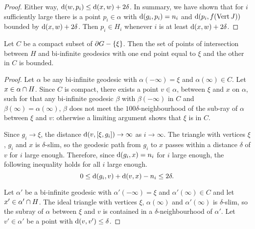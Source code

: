 \documentclass[a4paper]{article}
\begin{document}
\begin{proof}
  Either way, $\operatorname{d}(w, p_i) \leq \operatorname{d}(x,w) + 2\delta$. In summary, we have
  shown that for $i$ sufficiently large there is a point $p_i\in\alpha$ with
  $\operatorname{d}(g_i,p_i)=n_i$ and $\operatorname{d}(p_i,f(\operatorname{Vert} J))$ bounded by $\operatorname{d}(x,w) +
  2\delta$. Then $p_i \in H_i$ whenever $i$ is at least $\operatorname{d}(x,w) + 2\delta$.
\end{proof}

\begin{lemma}\label{lem:boundedintersection}
  Let $C$ be a compact subset of $\partial G - \left\{\xi\right\}$. Then the set of points 
  of intersection between $H$ and bi-infinite geodesics with one end point equal 
  to $\xi$ and the other in $C$ is bounded.
\end{lemma}

\begin{proof}
  Let $\alpha$ be any bi-infinite geodesic with $\alpha(-\infty)=\xi$ and 
  $\alpha(\infty)\in C$. Let $x \in \alpha \cap H$. Since $C$ is
  compact, there exists a point $v \in \alpha$, between $\xi$ and $x$ on
  $\alpha$, such for that any bi-infinite geodesic $\beta$ with
  $\beta(-\infty)$ in $C$ and $\beta(\infty) = \alpha(\infty)$, $\beta$ does
  not meet the $100\delta$-neighbourhood of the sub-ray of $\alpha$ between
  $\xi$ and $v$: otherwise a limiting argument shows that $\xi$ is in $C$.

  Since $g_i \to \xi$, the distance $\operatorname{d}(v, [\xi, g_i]) \to \infty$ as
  $i\to\infty$. The triangle with vertices $\xi$, $g_i$ and $x$ is
  $\delta$-slim, so the geodesic path from $g_i$ to $x$ passes within a
  distance $\delta$ of $v$ for $i$ large enough. Therefore, since $\operatorname{d}(g_i,
  x) = n_i$ for $i$ large enough, the following inequality holds for all $i$
  large enough.
  \begin{equation*}
    0 \leq \operatorname{d}(g_i, v) + \operatorname{d}(v, x) - n_i \leq 2\delta.
  \end{equation*}

  Let $\alpha'$ be a bi-infinite geodesic with $\alpha'(-\infty) = \xi$ and
  $\alpha'(\infty) \in C$ and let $x' \in \alpha' \cap H$. The ideal
  triangle with vertices $\xi$, $\alpha(\infty)$ and $\alpha'(\infty)$ is
  $\delta$-slim, so the subray of $\alpha$ between $\xi$ and $v$ is contained
  in a $\delta$-neighbourhood of $\alpha'$.  Let $v' \in \alpha'$ be a point
  with $\operatorname{d}(v, v') \leq \delta$. 
  

\end{proof}
\end{document}
